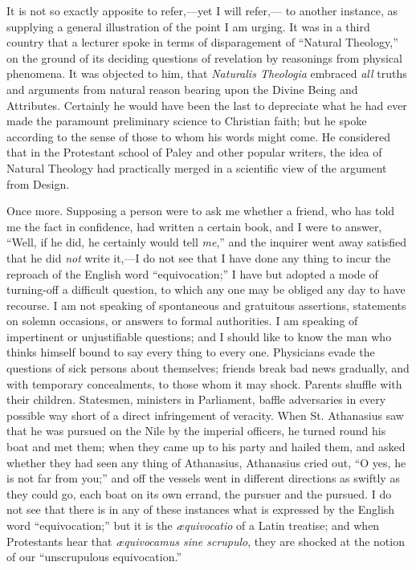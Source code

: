 It is not so exactly apposite to refer,—yet I
will refer,— to another instance, as supplying a general
illustration of the point I am urging. It was in a third country that a
lecturer spoke in terms of disparagement of ``Natural Theology,'' on the
ground of its deciding questions of revelation by reasonings from
physical phenomena. It was objected to him, that \emph{Naturalis Theologia}
embraced \emph{all} truths and arguments from natural reason bearing
upon the Divine Being and Attributes. Certainly he would have been the
last to depreciate what he had ever made the paramount preliminary
science to Christian faith; but he spoke according to the sense of those
to whom his words might come. He considered that in the Protestant
school of Paley and other popular writers, the idea of Natural Theology
had practically merged in a scientific view of the argument from Design.

Once more. Supposing a person were to ask me
whether a friend, who has told me the fact in confidence, had written a
certain book, and I were to answer, ``Well, if he did, he certainly would
tell \emph{me},'' and the inquirer went away satisfied that he did \emph{not}
write it,—I do not see that I have done any thing to incur the
reproach of the English word ``equivocation;'' I have but adopted a mode
of turning-off a difficult question, to which any one may be obliged any
day to have recourse. I am not speaking of spontaneous and gratuitous
assertions, statements on solemn occasions, or answers to formal
authorities. I am speaking of impertinent or unjustifiable questions;
and I should like to know the man who thinks himself bound to say every
thing to every one. Physicians evade the questions of sick persons about
themselves; friends break bad news gradually, and with temporary
concealments, to those whom it may shock. Parents shuffle with their
children. Statesmen, ministers in Parliament, baffle adversaries in
every possible way short of a direct infringement of veracity. When St.
Athanasius saw that he was pursued on the Nile by the imperial officers,
he turned round his boat and met them; when they came up to his party
and hailed them, and asked whether they had seen any thing of
Athanasius, Athanasius cried out, ``O yes, he is not far from you;'' and
off the vessels went in different directions as swiftly as they could
go, each boat on its own errand, the pursuer and the pursued. I do not
see that there is in any of these instances what is expressed by the
English word ``equivocation;'' but it is the \emph{æquivocatio} of a
Latin treatise; and when Protestants hear that \emph{æquivocamus sine
scrupulo}, they are shocked at the notion of our ``unscrupulous
equivocation.''

